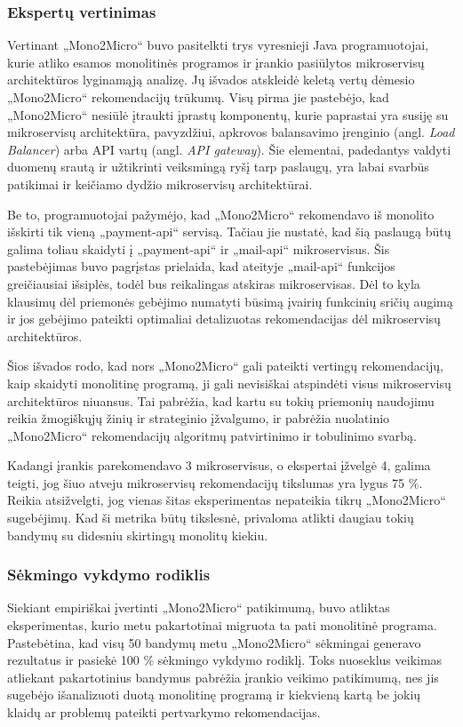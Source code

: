 \documentclass{VUMIFPSbakalaurinis}
\begin{document}
\subsubsection{Ekspertų vertinimas}
Vertinant „Mono2Micro“ buvo pasitelkti trys vyresnieji Java programuotojai, kurie atliko esamos monolitinės programos ir įrankio pasiūlytos mikroservisų architektūros lyginamąją analizę. Jų išvados atskleidė keletą vertų dėmesio „Mono2Micro“ rekomendacijų trūkumų. Visų pirma jie pastebėjo, kad „Mono2Micro“ nesiūlė įtraukti įprastų komponentų, kurie paprastai yra susiję su mikroservisų architektūra, pavyzdžiui, apkrovos balansavimo įrenginio (angl. \emph{Load Balancer}) arba API vartų (angl. \emph{API gateway}). Šie elementai, padedantys valdyti duomenų srautą ir užtikrinti veiksmingą ryšį tarp paslaugų, yra labai svarbūs patikimai ir keičiamo dydžio mikroservisų architektūrai.

Be to, programuotojai pažymėjo, kad „Mono2Micro“ rekomendavo iš monolito išskirti tik vieną „payment-api“ servisą. Tačiau jie nustatė, kad šią paslaugą būtų galima toliau skaidyti į „payment-api“ ir „mail-api“ mikroservisus. Šis pastebėjimas buvo pagrįstas prielaida, kad ateityje „mail-api“ funkcijos greičiausiai išsiplės, todėl bus reikalingas atskiras mikroservisas. Dėl to kyla klausimų dėl priemonės gebėjimo numatyti būsimą įvairių funkcinių sričių augimą ir jos gebėjimo pateikti optimaliai detalizuotas rekomendacijas dėl mikroservisų architektūros.

Šios išvados rodo, kad nors „Mono2Micro“ gali pateikti vertingų rekomendacijų, kaip skaidyti monolitinę programą, ji gali nevisiškai atspindėti visus mikroservisų architektūros niuansus. Tai pabrėžia, kad kartu su tokių priemonių naudojimu reikia žmogiškųjų žinių ir strateginio įžvalgumo, ir pabrėžia nuolatinio „Mono2Micro“ rekomendacijų algoritmų patvirtinimo ir tobulinimo svarbą.

Kadangi įrankis parekomendavo 3 mikroservisus, o ekspertai įžvelgė 4, galima teigti, jog šiuo atveju mikroservisų rekomendacijų tikslumas yra lygus 75 \%. Reikia atsižvelgti, jog vienas šitas eksperimentas nepateikia tikrų „Mono2Micro“ sugebėjimų. Kad ši metrika būtų tikslesnė, privaloma atlikti daugiau tokių bandymų su didesniu skirtingų monolitų kiekiu.

\subsubsection{Sėkmingo vykdymo rodiklis}
Siekiant empiriškai įvertinti „Mono2Micro“ patikimumą, buvo atliktas eksperimentas, kurio metu pakartotinai migruota ta pati monolitinė programa. Pastebėtina, kad visų 50 bandymų metu „Mono2Micro“ sėkmingai generavo rezultatus ir pasiekė 100 \% sėkmingo vykdymo rodiklį. Toks nuoseklus veikimas atliekant pakartotinius bandymus pabrėžia įrankio veikimo patikimumą, nes jis sugebėjo išanalizuoti duotą monolitinę programą ir kiekvieną kartą be jokių klaidų ar problemų pateikti pertvarkymo rekomendacijas.
\end{document}
